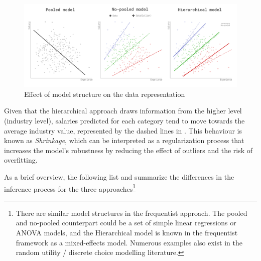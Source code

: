 \begin{figure}[H]
    \centering
    \includegraphics[width=1.0\textwidth]{images/ch5_simpsons_paradox/simpsons_paradox.png}
    \caption{Effect of model structure on the data representation}
    \label{fig:simpsons_paradox}
\end{figure}

Given that the hierarchical approach draws information from the higher level (industry level), salaries predicted for each category tend to move towards the average industry value, represented by the dashed lines in . This behaviour is known as \textit{Shrinkage}, which can be interpreted as a regularization process that increases the model's robustness by reducing the effect of outliers and the risk of overfitting. 

As a brief overview, the following list and  summarize the differences in the inference process for the three approaches\footnote{There are similar model structures in the frequentist approach. The pooled and no-pooled counterpart could be a set of simple linear regressions or ANOVA models, and the Hierarchical model is known in the frequentist framework as a mixed-effects model. Numerous examples also exist in the random utility / discrete choice modelling literature.}

